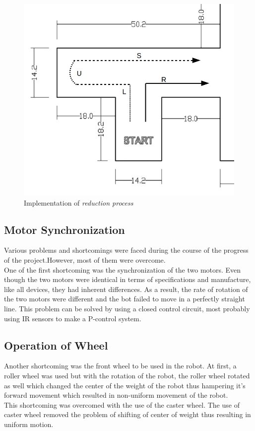\begin{figure}[h]
\center
\includegraphics[scale=0.5]{deconding_1_final.jpg}
\caption{Implementation of \textit{reduction process}} 
\end{figure}
\subsection{Motor Synchronization}
Various problems and shortcomings were faced during the course of the progress of the project.However, most of them were overcome.\\
One of the first shortcoming was the synchronization of the two motors. Even though the two motors were identical in terms of specifications and manufacture, like all devices, they had inherent differences. As a result, the rate of rotation of the two motors were different and the bot failed to move in a perfectly straight line. This problem can be solved by using a closed control circuit, most probably using IR sensors to make a P-control system.
\subsection{Operation of Wheel}
Another shortcoming was the front wheel to be used in the robot. At first, a roller wheel was used  but with the rotation of the robot, the roller wheel rotated as well which changed the center of the weight of the robot thus hampering it's forward movement which resulted in non-uniform movement of the robot.\\
This shortcoming was overcomed with the use of the caster wheel. The use of caster wheel removed the problem of shifting of center of weight thus resulting in uniform motion.
